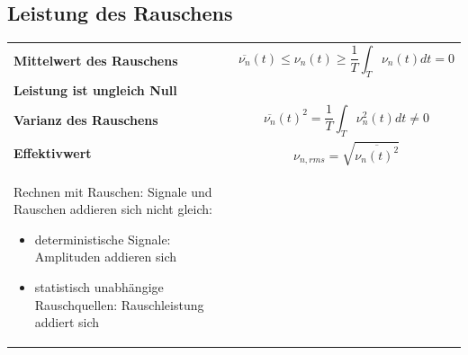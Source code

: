 \subsection{Leistung des Rauschens}
\begin{tabular}{ll}
\textbf{Mittelwert des Rauschens}&
\begin{minipage}{9cm}
\begin{equation}
\overline{\nu_{n}}(t)\leq \nu_{n}(t)\geq \frac{1}{T}\int_{T}\nu_{n}(t)dt=0
\end{equation}
\end{minipage}
\\
\textbf{Leistung ist ungleich Null}&\\
\textbf{Varianz des Rauschens}&
\begin{minipage}{9cm}
\begin{equation}
\overline{\nu_{n}}(t)^2=\frac{1}{T}\int_{T}\nu^2_{n}(t)dt\neq0
\end{equation}
\end{minipage}
\\
\textbf{Effektivwert}&
\begin{minipage}{9cm}
\begin{equation}
\nu_{n,rms}=\sqrt{\overline{\nu_{n}(t)^2}}
\end{equation}
\end{minipage}
\\
\begin{minipage}{9cm}
Rechnen mit Rauschen: Signale und Rauschen addieren sich nicht gleich:
\begin{itemize}
  \item deterministische Signale: Amplituden addieren sich
  \item statistisch unabhängige Rauschquellen: Rauschleistung addiert sich
\end{itemize}
\end{minipage}
&
\\
\end{tabular}

